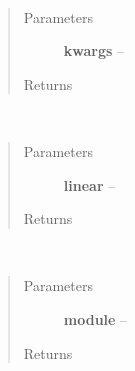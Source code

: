 \documentclass[letterpaper,10pt,english]{sphinxmanual}
\begin{document}

\begin{fulllineitems}
\label{index:aietes.Tools.kwarger}~\begin{quote}\begin{description}
\item[{Parameters}] \leavevmode
\textbf{kwargs} -- 

\item[{Returns}] \leavevmode


\end{description}\end{quote}

\end{fulllineitems}


\begin{fulllineitems}
\label{index:aietes.Tools.linear2db}~\begin{quote}\begin{description}
\item[{Parameters}] \leavevmode
\textbf{linear} -- 

\item[{Returns}] \leavevmode


\end{description}\end{quote}

\end{fulllineitems}


\begin{fulllineitems}
\label{index:aietes.Tools.list_functions}~\begin{quote}\begin{description}
\item[{Parameters}] \leavevmode
\textbf{module} -- 

\item[{Returns}] \leavevmode


\end{description}\end{quote}

\end{fulllineitems}
\end{document}
